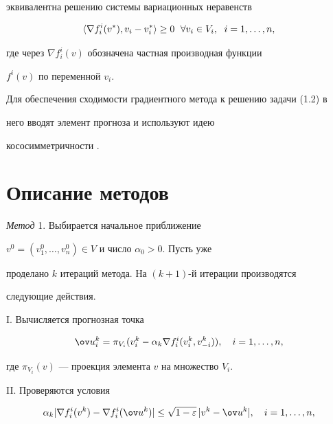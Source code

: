 эквивалентна решению системы вариационных неравенств 


\begin{equation} 


\la\nabla f^i_i(v^*),v_i-v^*_i\ra\ge0 


\ \; \forall v_i\in V_i,\ \; i=1,\dotsc,n, 


\end{equation} 


где через $\nabla f^i_i(v)$ обозначена частная производная функции 


$f^i(v)$ по переменной $v_i$. 


 


Для обеспечения сходимости градиентного метода к решению задачи (1.2) в 


него вводят элемент прогноза \cite{1} и используют идею 


кососимметричности \cite{2}. 


 


\section{Описание методов} 


 


{\it Метод} 1. Выбирается начальное приближение 


$v^0=(v^0_1,\dotsc,v^0_n)\in V$ и число $\alpha_0>0$. Пусть уже 


проделано $k$ итераций метода. На $(k+1)$-й итерации производятся 


следующие действия. 


 


I. Вычисляется прогнозная точка 


\begin{equation} 


\ov u{}^k_i=\pi_{V_i}(v^k_i-\alpha_k\nabla 


f^i_i(v^k_i,v^k_{-i})),\quad i=1,\dotsc,n, 


\end{equation} 


где $\pi_{V_i}(v)$ --- проекция элемента $v$ на множество $V_i$. 


 


II. Проверяются условия 


\begin{equation} 


\alpha_k|\nabla f^i_i(v^k)-\nabla f^i_i(\ov u{}^k)|\le 


\sqrt{1-\varepsilon}\,|v^k-\ov u{}^k|,\quad i=1,\dotsc,n, 


\end{equation} 


